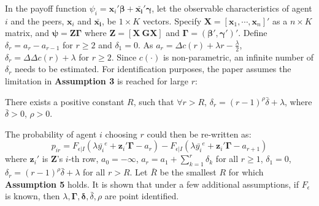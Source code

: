 In the payoff function $\psi_i=\mathbf{x}_i\mathbf{'\beta}+\mathbf{\bar{x_i}'\gamma}$, let the observable characteristics of agent $i$ and the peers, $\mathbf{x}_i$ and $\mathbf{\bar{x_i}}$, be $1 \times K$ vectors. Specify $\mathbf{X}=\left[\mathbf{x}_1,\cdots,\mathbf{x}_n\right]'$ as a $n \times K$ matrix, and $\mathbf{\psi=Z\Gamma}$ where $\mathbf{Z}=\left[\mathbf{X\ GX}\right]$ and $\mathbf{\Gamma}=\left(\mathbf{\beta}',\mathbf{\gamma}'\right)'$. Define $\delta_r=a_r-a_{r-1}$ for $r \geq 2$ and $\delta_1=0$. As $a_r=\Delta c(r)+\lambda r-\frac{\lambda}{2}$, $\delta_r=\Delta\Delta c(r)+\lambda$ for $r \geq 2$. Since $c(\cdot)$ is non-parametric, an infinite number of $\delta_r$ needs to be estimated. For identification purposes, the paper assumes the limitation in \textbf{Assumption 3} is reached for large $r$:

\begin{assumption}
  There exists a positive constant $R$, such that $\forall r > R$, $\delta_r=(r-1)^\rho\bar{\delta}+\lambda$, where $\bar{\delta}>0$, $\rho>0$.
\end{assumption}

The probability of agent $i$ choosing $r$ could then be re-written as:
\begin{equation}
    \nonumber
    p_{ir} = F_{\epsilon|I}\left( \lambda\bar{y_i}^e + \mathbf{z}_i'\mathbf{\Gamma} - a_r \right) - F_{\epsilon|I}\left( \lambda\bar{y_i}^e + \mathbf{z}_i'\mathbf{\Gamma} - a_{r+1} \right)
\end{equation}
where $\mathbf{z}_i'$ is $\mathbf{Z}$'s $i$-th row, $a_0=-\infty$, $a_r=a_1+\sum_{k=1}^r\delta_k$ for all $r \geq 1$, $\delta_1=0$, $\delta_r=(r-1)^\rho \bar{\delta}+\lambda$ for all $r>R$. Let $\bar{R}$ be the smallest $R$ for which \textbf{Assumption 5} holds. It is shown that under a few additional assumptions, if $F_\epsilon$ is known, then $\lambda,\mathbf{\Gamma},\mathbf{\delta},\bar{\delta},\rho$ are point identified.

